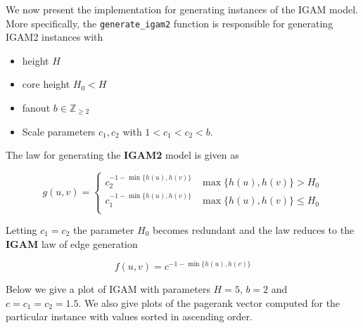 \documentclass[11pt]{article}
\providecommand{\tightlist}{%
      \setlength{\itemsep}{0pt}\setlength{\parskip}{0pt}}
\begin{document}
We now present the implementation for generating instances of the IGAM
model. More specifically, the \texttt{generate\_igam2} function is
responsible for generating IGAM2 instances with

\begin{itemize}
\tightlist
\item
  height \(H\)
\item
  core height \(H_0 < H\)
\item
  fanout \(b \in \mathbb Z_{\ge 2}\)
\item
  Scale parameters \(c_1, c_2\) with \(1 < c_1 < c_2 < b\).
\end{itemize}

The law for generating the \textbf{IGAM2} model is given as

\begin{equation*}
    g(u, v) = \begin{cases}
        c_2^{-1-\min \{h(u), h(v) \}} & \max \{ h(u), h(v) \} > H_0 \\
        c_1^{-1-\min \{ h(u), h(v) \} } & \max \{ h(u), h(v) \} \le H_0 \\
    \end{cases}
\end{equation*}

Letting \(c_1 = c_2\) the parameter \(H_0\) becomes redundant and the
law reduces to the \textbf{IGAM} law of edge generation

\begin{equation*}
  f(u, v) = c^{-1-\min \{ h(u), h(v) \}}
\end{equation*}

Below we give a plot of IGAM with parameters \(H = 5\), \(b = 2\) and
\(c = c_1 = c_2 = 1.5\). We also give plots of the pagerank vector
computed for the particular instance with values sorted in ascending
order.
\end{document}
